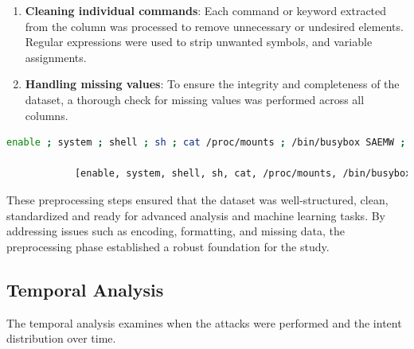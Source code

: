 \begin{enumerate}
            \item \textbf{Cleaning individual commands}: Each command or keyword extracted from the  column was processed to remove unnecessary or undesired elements. Regular expressions were used to strip unwanted symbols, and variable assignments. 
            
            \vspace{0.2em}
            
            \item \textbf{Handling missing values}: 
            To ensure the integrity and completeness of the dataset, a thorough check for missing values was performed across all columns.
            
        \end{enumerate}
        
        \begin{lstlisting}[language=sh, caption={Dataset Processing}, label={lst:dataset-processing}]
            enable ; system ; shell ; sh ; cat /proc/mounts ; /bin/busybox SAEMW ; cd /dev/shm ; cat .s || cp /bin/echo .s ; /bin/busybox SAEMW ; tftp ; wget ; /bin/busybox SAEMW ; dd bs=52 count=1 if=.s || cat .s || while read i ; do echo $i ; done < .s ; /bin/busybox SAEMW ; rm .s ; exit ;
            
            [enable, system, shell, sh, cat, /proc/mounts, /bin/busybox, SAEMW, cd, /dev/shm, cat, .s, cp, /bin/echo, .s, /bin/busybox, SAEMW, tftp, wget , /bin/busybox, SAEMW, dd, bs, count, if, cat, .s, while, read, i, do, echo, i, done, .s, /bin/busybox, SAEMW, rm, .s, exit]
        \end{lstlisting}

        These preprocessing steps ensured that the dataset was well-structured, clean, standardized and ready for advanced analysis and machine learning tasks. By addressing issues such as encoding, formatting, and missing data, the preprocessing phase established a robust foundation for the study.

    \subsection{Temporal Analysis}
    
        The temporal analysis examines when the attacks were performed and the intent distribution over time.
        
